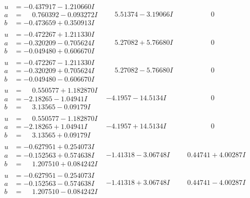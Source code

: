 \documentclass[1p]{elsarticle_modified}
\theoremstyle{definition}
\begin{document}
$$\begin{array}{c|c|c}
\begin{aligned}
u &= -0.437917 - 1.210660 I \\
a &= \phantom{-}0.760392 - 0.093272 I \\
b &= -0.473659 + 0.350913 I\end{aligned}
 & \phantom{-}5.51374 - 3.19066 I & \phantom{-0.000000 } 0 \\ \hline\begin{aligned}
u &= -0.472267 + 1.211330 I \\
a &= -0.320209 - 0.705624 I \\
b &= -0.049480 + 0.606670 I\end{aligned}
 & \phantom{-}5.27082 + 5.76680 I & \phantom{-0.000000 } 0 \\ \hline\begin{aligned}
u &= -0.472267 - 1.211330 I \\
a &= -0.320209 + 0.705624 I \\
b &= -0.049480 - 0.606670 I\end{aligned}
 & \phantom{-}5.27082 - 5.76680 I & \phantom{-0.000000 } 0 \\ \hline\begin{aligned}
u &= \phantom{-}0.550577 + 1.182870 I \\
a &= -2.18265 - 1.04941 I \\
b &= \phantom{-}3.13565 - 0.09179 I\end{aligned}
 & -4.1957 - 14.5134 I & \phantom{-0.000000 } 0 \\ \hline\begin{aligned}
u &= \phantom{-}0.550577 - 1.182870 I \\
a &= -2.18265 + 1.04941 I \\
b &= \phantom{-}3.13565 + 0.09179 I\end{aligned}
 & -4.1957 + 14.5134 I & \phantom{-0.000000 } 0 \\ \hline\begin{aligned}
u &= -0.627951 + 0.254073 I \\
a &= -0.152563 + 0.574638 I \\
b &= \phantom{-}1.207510 + 0.084242 I\end{aligned}
 & -1.41318 - 3.06748 I & \phantom{-}0.44741 + 4.00287 I \\ \hline\begin{aligned}
u &= -0.627951 - 0.254073 I \\
a &= -0.152563 - 0.574638 I \\
b &= \phantom{-}1.207510 - 0.084242 I\end{aligned}
 & -1.41318 + 3.06748 I & \phantom{-}0.44741 - 4.00287 I\\

\end{array}$$
\end{document}
